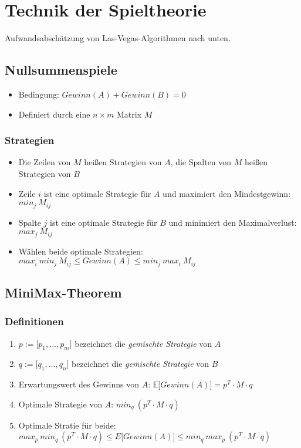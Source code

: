 \section{Technik der Spieltheorie}
Aufwandsabschätzung von Las-Vegas-Algorithmen nach unten.

\subsection{Nullsummenspiele}
\begin{itemize}
	\item Bedingung: \(Gewinn(A) + Gewinn(B) = 0\)
	\item Definiert durch eine \(n \times m\) Matrix \(M\)
\end{itemize}

\subsubsection{Strategien}
\begin{itemize}
	\item Die Zeilen von \(M\) heißen Strategien von \(A\), die Spalten von \(M\) heißen Strategien von \(B\)
	\item Zeile \(i\) ist eine optimale Strategie für \(A\) und maximiert den Mindestgewinn: \(min_j~M_{ij}\)
	\item Spalte \(j\) ist eine optimale Strategie für \(B\) und minimiert den Maximalverlust: \(max_j~M_{ij}\)
	\item Wählen beide optimale Strategien: \(max_i~min_j~M_{ij} \leq Gewinn(A) \leq min_j~max_i~M_{ij}\)
\end{itemize}


\subsection{MiniMax-Theorem}

\subsubsection{Definitionen}
\begin{enumerate}
	\item \(p := \lbrack p_1,...,p_m \rbrack \) bezeichnet die \textit{gemischte Strategie} von \(A\)
	\item \(q := \lbrack q_1,...,q_n \rbrack \) bezeichnet die \textit{gemischte Strategie} von \(B\)
	\item Erwartungswert des Gewinns von \(A\): \(\mathbb{E}\lbrack Gewinn(A) \rbrack = p^T \cdot M \cdot q\)
	\item Optimale Strategie von \(A\): \(min_q~(p^T \cdot M \cdot q)\)
	\item Optimale Stratie für beide: \\ \(max_p~min_q~(p^T \cdot M \cdot q) \leq E \lbrack Gewinn(A) \rbrack \leq min_q~max_p~(p^T \cdot M \cdot q)\)
\end{enumerate}


